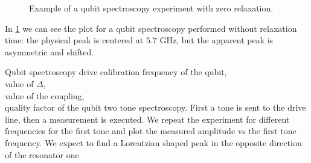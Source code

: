 \begin{figure}[ht]
    \caption{Example of a qubit spectroscopy experiment with zero relaxation.}
    \label{fig:qubit_spectroscopy_no_relax}
\end{figure}

In \cref{fig:qubit_spectroscopy_no_relax} we can see the plot for a qubit spectroscopy performed without relaxation time: the physical peak is centered at $5.7$ GHz, but the apparent peak is asymmetric and shifted.

\experimentrecap
{Qubit spectroscopy}
{drive calibration}
{frequency of the qubit,\\value of $\Delta$,\\value of the coupling,\\quality factor of the qubit}
{two tone spectroscopy. First a tone is sent to the drive line, then a measurement is executed. We repeat the experiment for different frequencies for the first tone and plot the measured amplitude vs the first tone frequency. We expect to find a Lorentzian shaped peak in the opposite direction of the resonator one}
